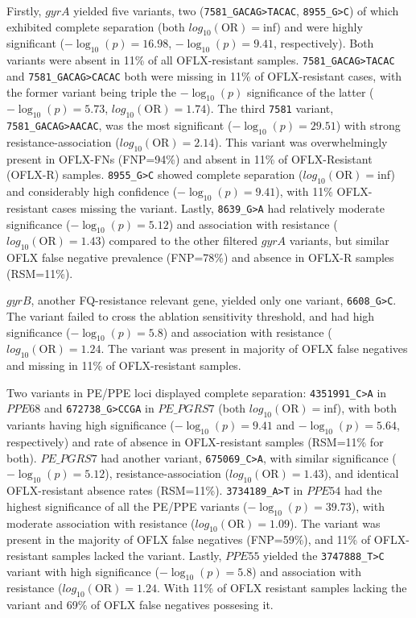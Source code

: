 Firstly, $gyrA$ yielded five variants, two (\texttt{7581\_GACAG>TACAC}, \texttt{8955\_G>C}) of which exhibited complete separation (both $log_{10}(\text{OR})=$inf) and were highly significant ($-\log_{10}(p)=16.98$, $-\log_{10}(p)=9.41$, respectively). Both variants were absent in 11\% of all OFLX-resistant samples. \texttt{7581\_GACAG>TACAC} and \texttt{7581\_GACAG>CACAC} both were missing in 11\% of OFLX-resistant cases, with the former variant being triple the $-\log_{10}(p)$ significance of the latter ($-\log_{10}(p)=5.73$, $log_{10}(\text{OR})=1.74$). The third \texttt{7581} variant, \texttt{7581\_GACAG>AACAC}, was the most significant ($-\log_{10}(p)=29.51$) with strong resistance-association ($log_{10}(\text{OR})=2.14$). This variant was overwhelmingly present in OFLX-FNs (FNP=94\%) and absent in 11\% of OFLX-Resistant (OFLX-R) samples. \texttt{8955\_G>C} showed complete separation ($log_{10}(\text{OR})=$inf) and considerably high confidence ($-\log_{10}(p)=9.41$), with 11\% OFLX-resistant cases missing the variant. Lastly, \texttt{8639\_G>A} had relatively moderate significance ($-\log_{10}(p)=5.12$) and association with resistance ($log_{10}(\text{OR})=1.43$) compared to the other filtered $gyrA$ variants, but similar OFLX false negative prevalence (FNP=78\%) and absence in OFLX-R samples (RSM=11\%). 

$gyrB$, another FQ-resistance relevant gene, yielded only one variant, \texttt{6608\_G>C}. The variant failed to cross the ablation sensitivity threshold, and had high significance ($-\log_{10}(p)=5.8$) and association with resistance ($log_{10}(\text{OR})=1.24$. The variant was present in majority of OFLX false negatives and missing in 11\% of OFLX-resistant samples. 

Two variants in PE/PPE loci displayed complete separation: \texttt{4351991\_C>A} in $PPE68$ and \texttt{672738\_G>CCGA} in $PE\_PGRS7$ (both $log_{10}(\text{OR})=$inf), with both variants having high significance ($-\log_{10}(p)=9.41$ and $-\log_{10}(p)=5.64$, respectively) and rate of absence in OFLX-resistant samples (RSM=11\% for both). $PE\_PGRS7$ had another variant, \texttt{675069\_C>A}, with similar significance ($-\log_{10}(p)=5.12$), resistance-association ($log_{10}(\text{OR})=1.43$), and identical OFLX-resistant absence rates (RSM=11\%). \texttt{3734189\_A>T} in $PPE54$ had the highest significance of all the PE/PPE variants ($-\log_{10}(p)=39.73$), with moderate association with resistance ($log_{10}(\text{OR})=1.09$). The variant was present in the majority of OFLX false negatives (FNP=59\%), and 11\% of OFLX-resistant samples lacked the variant. Lastly, $PPE55$ yielded the \texttt{3747888\_T>C} variant with high significance ($-\log_{10}(p)=5.8$) and association with resistance ($log_{10}(\text{OR})=1.24$. With 11\% of OFLX resistant samples lacking the variant and 69\% of OFLX false negatives possesing it.  

